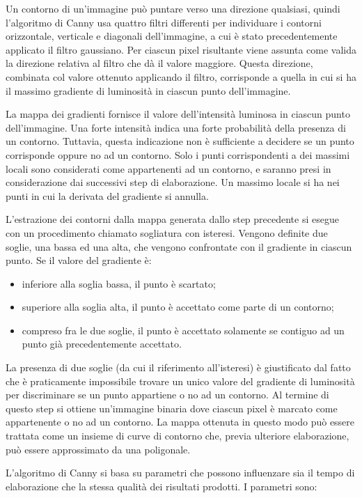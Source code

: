 Un contorno di un'immagine può puntare verso una direzione qualsiasi, quindi l'algoritmo di Canny usa quattro filtri differenti per individuare i contorni orizzontale, verticale e diagonali dell'immagine, a cui è stato precedentemente applicato il filtro gaussiano. Per ciascun pixel risultante viene assunta come valida la direzione relativa al filtro che dà il valore maggiore. Questa direzione, combinata col valore ottenuto applicando il filtro, corrisponde a quella in cui si ha il massimo gradiente di luminosità in ciascun punto dell'immagine.

La mappa dei gradienti fornisce il valore dell'intensità luminosa in ciascun punto dell'immagine. Una forte intensità indica una forte probabilità della presenza di un contorno. Tuttavia, questa indicazione non è sufficiente a decidere se un punto corrisponde oppure no ad un contorno. Solo i punti corrispondenti a dei massimi locali sono considerati come appartenenti ad un contorno, e saranno presi in considerazione dai successivi step di elaborazione. Un massimo locale si ha nei punti in cui la derivata del gradiente si annulla.

L'estrazione dei contorni dalla mappa generata dallo step precedente si esegue con un procedimento chiamato sogliatura con isteresi. Vengono definite due soglie, una bassa ed una alta, che vengono confrontate con il gradiente in ciascun punto. Se il valore del gradiente è:
\begin{itemize}
\item inferiore alla soglia bassa, il punto è scartato;
\item superiore alla soglia alta, il punto è accettato come parte di un contorno;
\item compreso fra le due soglie, il punto è accettato solamente se contiguo ad un punto già precedentemente accettato.
\end{itemize}
La presenza di due soglie (da cui il riferimento all'isteresi) è giustificato dal fatto che è praticamente impossibile trovare un unico valore del gradiente di luminosità per discriminare se un punto appartiene o no ad un contorno. Al termine di questo step si ottiene un'immagine binaria dove ciascun pixel è marcato come appartenente o no ad un contorno. La mappa ottenuta in questo modo può essere trattata come un insieme di curve di contorno che, previa ulteriore elaborazione, può essere approssimato da una poligonale.

L'algoritmo di Canny si basa su parametri che possono influenzare sia il tempo di elaborazione che la stessa qualità dei risultati prodotti. I parametri sono:

